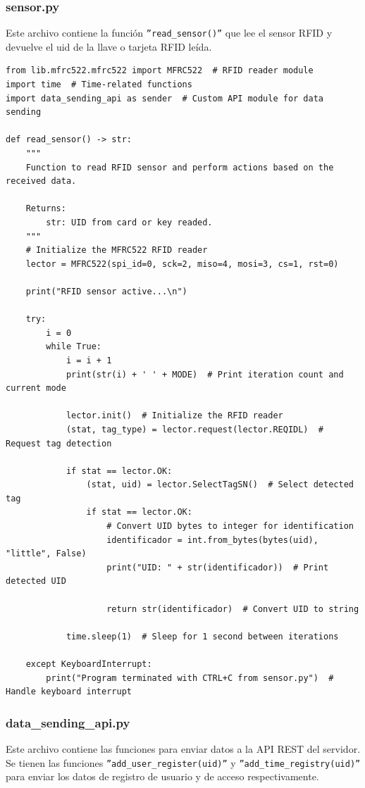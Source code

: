 \documentclass{article}
\begin{document}
\subsubsection{sensor.py}
Este archivo contiene la función \texttt{''read\_sensor()''} que lee el sensor RFID y devuelve el uid de la llave o tarjeta RFID leída.
\begin{lstlisting}
from lib.mfrc522.mfrc522 import MFRC522  # RFID reader module
import time  # Time-related functions
import data_sending_api as sender  # Custom API module for data sending

def read_sensor() -> str:
    """
    Function to read RFID sensor and perform actions based on the received data.

    Returns:
        str: UID from card or key readed.
    """
    # Initialize the MFRC522 RFID reader
    lector = MFRC522(spi_id=0, sck=2, miso=4, mosi=3, cs=1, rst=0)

    print("RFID sensor active...\n")

    try:
        i = 0
        while True:
            i = i + 1
            print(str(i) + ' ' + MODE)  # Print iteration count and current mode

            lector.init()  # Initialize the RFID reader
            (stat, tag_type) = lector.request(lector.REQIDL)  # Request tag detection

            if stat == lector.OK:
                (stat, uid) = lector.SelectTagSN()  # Select detected tag
                if stat == lector.OK:
                    # Convert UID bytes to integer for identification
                    identificador = int.from_bytes(bytes(uid), "little", False)
                    print("UID: " + str(identificador))  # Print detected UID

                    return str(identificador)  # Convert UID to string
                
            time.sleep(1)  # Sleep for 1 second between iterations

    except KeyboardInterrupt:
        print("Program terminated with CTRL+C from sensor.py")  # Handle keyboard interrupt
\end{lstlisting}

\subsubsection{data\_sending\_api.py}
Este archivo contiene las funciones para enviar datos a la API REST del servidor.
Se tienen las funciones \texttt{''add\_user\_register(uid)''} y \texttt{''add\_time\_registry(uid)''} para enviar los datos de registro de usuario y de acceso respectivamente.
\end{document}
